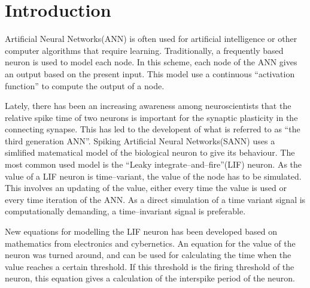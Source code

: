 





%

\section{Introduction}
Artificial Neural Networks(ANN) is often used for artificial intelligence or other computer algorithms that require learning.
Traditionally, a frequently based neuron is used to model each node.
In this scheme, each node of the ANN gives an output based on the present input.
This model use a continuous ``activation function'' to compute the output of a node.

Lately, there has been an increasing awareness among neuroscientists that the relative spike time of two neurons is important for the synaptic plasticity in the connecting synapse.
This has led to the developent of what is referred to as ``the third generation ANN''.
Spiking Artificial Neural Networks(SANN) uses a simlified matematical model of the biological neuron to give its behaviour. %
The most common used model is the ``Leaky integrate--and--fire''(LIF) neuron\cite{Maass97networksof}.
As the value of a LIF neuron is time--variant, the value of the node has to be simulated. 
This involves an updating of the value, either every time the value is used or every time iteration of the ANN.
As a direct simulation of a time variant signal is computationally demanding, a time--invariant signal is preferable.

New equations for modelling the LIF neuron has been developed based on mathematics from electronics and cybernetics.
An equation for the value of the neuron was turned around, and can be used for calculating the time when the value reaches a certain threshold.
If this threshold is the firing threshold of the neuron, this equation gives a calculation of the interspike period of the neuron.

